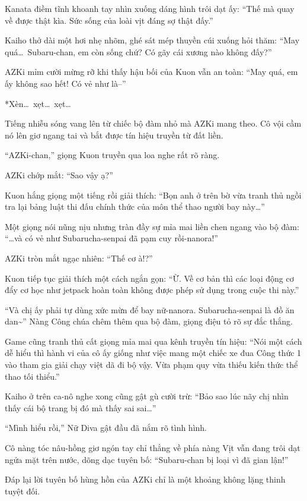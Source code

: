 \documentclass[../main.tex]{subfiles}
\begin{document}
Kanata điềm tĩnh khoanh tay nhìn xuống dáng hình trôi dạt ấy: ``Thế mà quay về được thật kìa. Sức sống của loài vịt đáng sợ thật đấy.''

Kaiho thở dài một hơi nhẹ nhõm, ghé sát mép thuyền cúi xuống hỏi thăm: ``May quá\dots\ Subaru-chan, em còn sống chứ? Có gãy cái xương nào không đấy?''

AZKi mỉm cười mừng rỡ khi thấy hậu bối của Kuon vẫn an toàn: ``May quá, em ấy không sao hết! Có vẻ như là--''

*Xèn\dots\ xẹt\dots\ xẹt\dots*

Tiếng nhiễu sóng vang lên từ chiếc bộ đàm nhỏ mà AZKi mang theo. Cô vội cầm nó lên giơ ngang tai và bắt được tín hiệu truyền từ đất liền.

``AZKi-chan,'' giọng Kuon truyền qua loa nghe rất rõ ràng.

AZKi chớp mắt: ``Sao vậy ạ?''

Kuon hắng giọng một tiếng rồi giải thích: ``Bọn anh ở trên bờ vừa tranh thủ ngồi tra lại bảng luật thi đấu chính thức của môn thể thao người bay này\dots''

Một giọng nói nũng nịu nhưng tràn đầy sự mỉa mai liền chen ngang vào bộ đàm: ``\dots và có vẻ như Subarucha-senpai đã pạm cuy rồi-nanora!''

AZKi tròn mắt ngạc nhiên: ``Thế cơ à!?''

Kuon tiếp tục giải thích một cách ngắn gọn: ``Ừ. Về cơ bản thì các loại động cơ đẩy cơ học như jetpack hoàn toàn không được phép sử dụng trong cuộc thi này.''

``Và chị ấy phải tự dùng xức mừn để bay nữ-nanora. Subarucha-senpai là đồ ăn dan\~{}'' Nàng Công chúa chêm thêm qua bộ đàm, giọng điệu tỏ rõ sự đắc thắng.

Game cũng tranh thủ cất giọng mỉa mai qua kênh truyền tín hiệu: ``Nói một cách dễ hiểu thì hành vi của cô ấy giống như việc mang một chiếc xe đua Công thức 1 vào tham gia giải chạy việt dã đi bộ vậy. Vừa phạm quy vừa thiếu kiến thức thể thao tối thiểu.''

Kaiho ở trên ca-nô nghe xong cũng gật gù cười trừ: ``Bảo sao lúc nãy chị nhìn thấy cái bộ trang bị đó mà thấy sai sai\dots''

``Mình hiểu rồi,'' Nữ Diva gật đầu đã nắm rõ tình hình.

Cô nàng tóc nâu-hồng giơ ngón tay chỉ thẳng về phía nàng Vịt vẫn đang trôi dạt ngửa mặt trên nước, dõng dạc tuyên bố: ``Subaru-chan bị loại vì đã gian lận!''

Đáp lại lời tuyên bố hùng hồn của AZKi chỉ là một khoảng không lặng thinh tuyệt đối.
\end{document}

